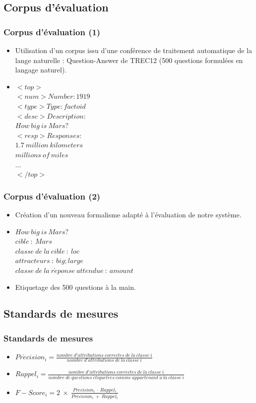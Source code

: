 \documentclass[xcolor=dvipsnames]{beamer}
\begin{document}
\subsection{Corpus d'évaluation}
\frame
{
  \frametitle{Corpus d'évaluation (1)}
  \begin{itemize}
    \item<1-> Utilisation d'un corpus issu d'une conférence de traitement automatique de la lange naturelle : Question-Answer de TREC12 (500 questions formulées en langage naturel).
    \item<2-> $<top>$\\
$<num> Number: 1919$\\
$<type> Type: factoid$\\
$<desc> Description:$\\
$How \: big \: is \: Mars?$\\
$<resp> Responses:$\\
$1.7 \: million \: kilometers$\\
$millions \: of \: miles$\\
$...$\\
$</top>$
  \end{itemize}
}
\frame
{
  \frametitle{Corpus d'évaluation (2)}
  \begin{itemize}
    \item<1-> Création d'un nouveau formalisme adapté à l'évaluation de notre système.
    \item<2-> $How \: big \: is \: Mars?$\\
    $cible \: : \: Mars$\\
    $classe \: de \: la \: cible \: : \: loc$\\
    $attracteurs \: : \: big;large$\\
    $classe \: de \: la \: r\acute{e}ponse \: attendue \: : \: amount$
    \item<3-> Etiquetage des 500 questions \og{}à la main\fg{}. 
  \end{itemize}
}
\subsection{Standards de mesures}
\frame
{
  \frametitle{Standards de mesures}
  \begin{itemize}
    \item<1-> $Pr\acute{e}cision_i = \frac{nombre \: d'attributions \: correctes \: de \: la \: classe \: i}{nombre \: d'attributions \: de \: la \: classe \: i}$
    \item<2-> $Rappel_i = \frac{nombre \: d'attributions \: correctes \: de \: la \: classe \: i}{nombre \: de \: questions \: \acute{e}tiquet\acute{e}es \: comme \: appartenant \: \grave{a} \: la \: classe \: i}$
    \item<3-> $F-Score_i = 2 \: \times \: \frac{Pr\acute{e}cision_i \: \cdot \: Rappel_i}{Pr\acute{e}cision_i \: + \: Rappel_i}$
  \end{itemize}
}
\end{document}
